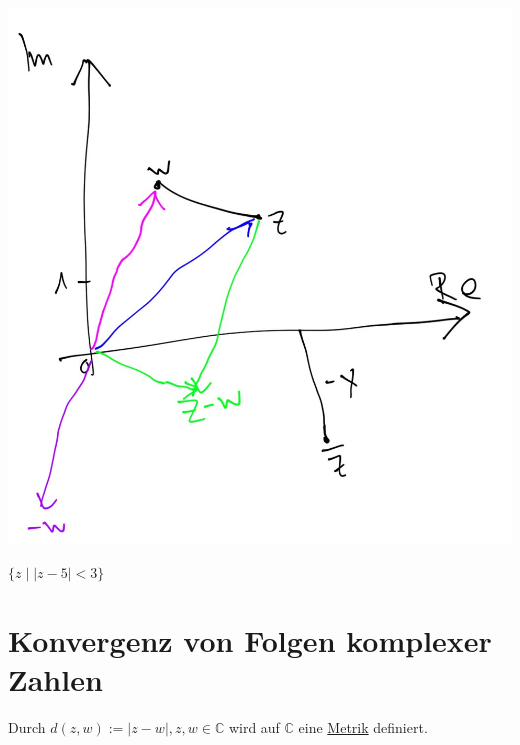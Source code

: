 \documentclass[a4paper,11pt,notitlepage]{report}
\theoremstyle{definition}
\newcommand{\C}{{\ensuremath{\mathbb{C}}}}
\begin{document}
\begin{center}
\includegraphics[scale=0.2]{images/16_04_12_02.jpg}
\end{center}

$\{z \mid |z-5| < 3\}$

\section{Konvergenz von Folgen komplexer Zahlen}

Durch $d(z,w):= |z-w|, z,w \in \C$ wird auf $\C$ eine \underline{Metrik} definiert.
\end{document}
